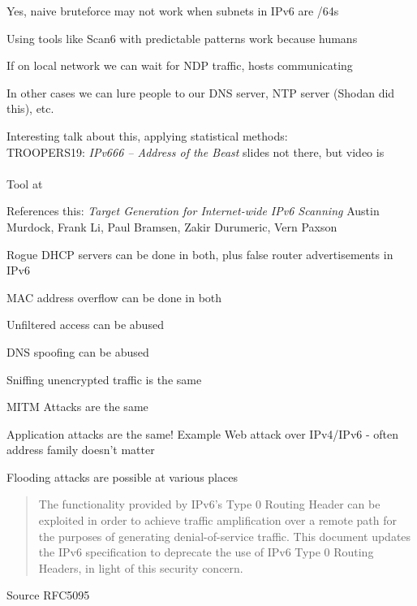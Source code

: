 \documentclass[Screen16to9,17pt]{foils}
\newcommand{\myalert}{\color{red}\faFlag}
\begin{document}

\begin{list2}
\item Yes, naive bruteforce may not work when subnets in IPv6 are /64s
\item Using tools like Scan6 with predictable patterns work because humans
\item If on local network we can wait for NDP traffic, hosts communicating
\item In other cases we can lure people to our DNS server, NTP server (Shodan did this), etc.
\end{list2}

Interesting talk about this, applying statistical methods:\\
TROOPERS19: \emph{IPv666 – Address of the Beast} slides not there, but video is\\
\\
Tool at 


References this: \emph{Target Generation for Internet-wide IPv6 Scanning}
Austin Murdock, Frank Li, Paul Bramsen, Zakir Durumeric, Vern Paxson



\begin{list2}
\item Rogue DHCP servers can be done in both, plus false router advertisements in IPv6
\item MAC address overflow can be done in both
\item Unfiltered access can be abused
\item DNS spoofing can be abused
\item Sniffing unencrypted traffic is the same
\item MITM Attacks are the same {\myalert}
\item Application attacks are the same! Example Web attack over IPv4/IPv6 - often address family doesn't matter {\myalert}
\item Flooding attacks are possible at various places 
\end{list2}



\begin{quote}
The functionality provided by IPv6's Type 0 Routing Header can be exploited in order to achieve traffic amplification over a remote path for the purposes of generating denial-of-service traffic.  This document updates the IPv6 specification to deprecate the use of IPv6 Type 0 Routing Headers, in light of this security concern.
\end{quote}
Source RFC5095
\end{document}
